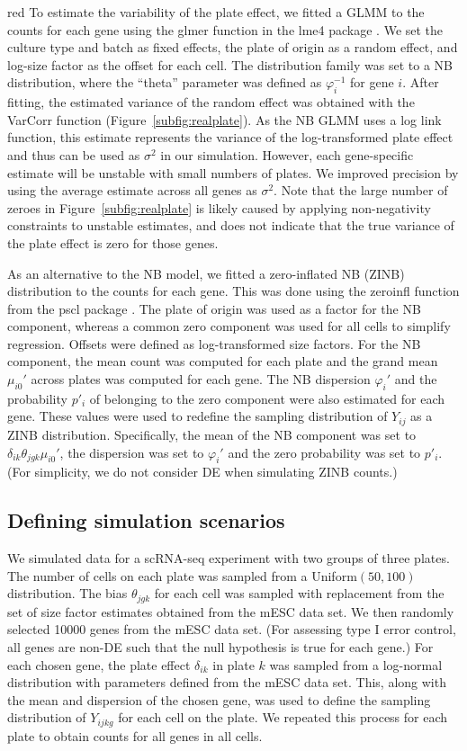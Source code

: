 \documentclass{article}
\begin{document}
\begin{color}{red}
To estimate the variability of the plate effect, we fitted a GLMM to the counts for each gene using the glmer function in the lme4 package \citep{bates2015fitting}.
We set the culture type and batch as fixed effects, the plate of origin as a random effect, and log-size factor as the offset for each cell.
The distribution family was set to a NB distribution, where the ``theta'' parameter was defined as $\varphi_i^{-1}$ for gene $i$.
After fitting, the estimated variance of the random effect was obtained with the VarCorr function (Figure~\ref{subfig:realplate}).
As the NB GLMM uses a log link function, this estimate represents the variance of the log-transformed plate effect and thus can be used as $\sigma^2$ in our simulation.
However, each gene-specific estimate will be unstable with small numbers of plates.
We improved precision by using the average estimate across all genes as $\sigma^2$.
Note that the large number of zeroes in Figure~\ref{subfig:realplate} is likely caused by applying non-negativity constraints to unstable estimates, and does not indicate that the true variance of the plate effect is zero for those genes. 

As an alternative to the NB model, we fitted a zero-inflated NB (ZINB) distribution to the counts for each gene.
This was done using the zeroinfl function from the pscl package \citep{zeilis2008regression}.
The plate of origin was used as a factor for the NB component, whereas a common zero component was used for all cells to simplify regression.
Offsets were defined as log-transformed size factors.
For the NB component, the mean count was computed for each plate and the grand mean $\mu_{i0}'$ across plates was computed for each gene.
The NB dispersion $\varphi_i'$ and the probability $p'_i$ of belonging to the zero component were also estimated for each gene.
These values were used to redefine the sampling distribution of $Y_{ij}$ as a ZINB distribution.
Specifically, the mean of the NB component was set to $\delta_{ik}\theta_{jgk}\mu_{i0}'$, the dispersion was set to $\varphi_i'$ and the zero probability was set to $p'_i$.
(For simplicity, we do not consider DE when simulating ZINB counts.)

\subsection{Defining simulation scenarios}
We simulated data for a scRNA-seq experiment with two groups of three plates.
The number of cells on each plate was sampled from a Uniform$(50, 100)$ distribution.
The bias $\theta_{jgk}$ for each cell was sampled with replacement from the set of size factor estimates obtained from the mESC data set.
We then randomly selected 10000 genes from the mESC data set.
(For assessing type I error control, all genes are non-DE such that the null hypothesis is true for each gene.)
For each chosen gene, the plate effect $\delta_{ik}$ in plate $k$ was sampled from a log-normal distribution with parameters defined from the mESC data set.
This, along with the mean and dispersion of the chosen gene, was used to define the sampling distribution of $Y_{ijkg}$ for each cell on the plate.
We repeated this process for each plate to obtain counts for all genes in all cells.


\end{color}
\end{document}

